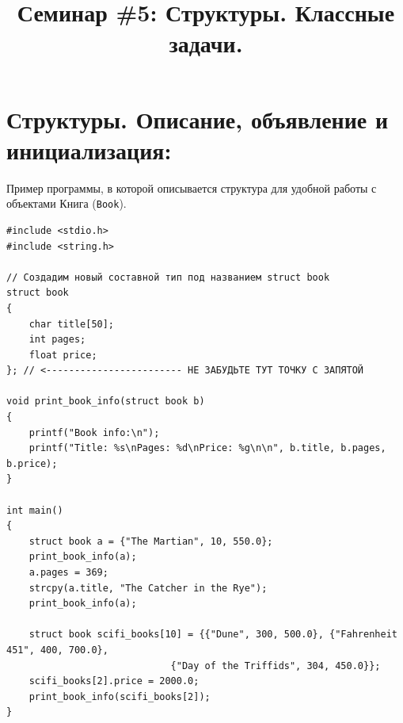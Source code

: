 \documentclass{article}
\begin{document}
\pagestyle{plain}

\title{Семинар \#5: Структуры. Классные задачи.\vspace{-5ex}}\date{}\maketitle
\section*{Структуры. Описание, объявление и инициализация:}
Пример программы, в которой описывается структура для удобной работы с объектами Книга (\texttt{Book}).
\begin{lstlisting}
#include <stdio.h>
#include <string.h>

// Создадим новый составной тип под названием struct book
struct book
{
    char title[50];
    int pages;
    float price;
}; // <------------------------ НЕ ЗАБУДЬТЕ ТУТ ТОЧКУ С ЗАПЯТОЙ

void print_book_info(struct book b)
{
    printf("Book info:\n");
    printf("Title: %s\nPages: %d\nPrice: %g\n\n", b.title, b.pages, b.price);
}

int main()
{
    struct book a = {"The Martian", 10, 550.0};
    print_book_info(a);
    a.pages = 369;
    strcpy(a.title, "The Catcher in the Rye");
    print_book_info(a);
    
    struct book scifi_books[10] = {{"Dune", 300, 500.0}, {"Fahrenheit 451", 400, 700.0},
							 {"Day of the Triffids", 304, 450.0}};
    scifi_books[2].price = 2000.0;
    print_book_info(scifi_books[2]);
}
\end{lstlisting}
\end{document}
